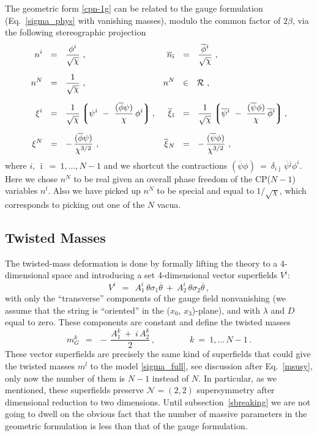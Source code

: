 \documentclass[12pt]{article}
\newcommand{\ntwot}{${\mathcal N}= \left(2,2\right) $ }
\newcommand{\ov}{\overline}
\newcommand{\mc}[1]{\mathcal{#1}}
\newcommand{\lgr}{\left\lgroup}
\newcommand{\rgr}{\right\rgroup}
\newcommand{\bi}{{\bar \imath}}
\newcommand{\bj}{{\bar \jmath}}
\begin{document}
	The geometric form \eqref{cpn-1g} can be related to the gauge formulation (Eq.~\eqref{sigma_phys} with
	vanishing masses), modulo the common factor of $ 2\beta $, via the following stereographic projection
\begin{align}
%
\notag
	n^i & ~~=~~ \frac{\phi^i}{\sqrt{\chi}}~,
	& 
	\ov{n}_\bi & ~~=~~ \frac{\ov{\phi}{}^\bi}{\sqrt{\chi}}~,
\\[2mm]
%
\label{stereo}
	n^N & ~~=~~ \frac{1}{\sqrt{\chi}}~,
	& n^N & ~~\in~~ \mc{R}~,
\\[2mm]
%
\notag
	\xi^i & ~~=~~ \frac{1}{\sqrt{\chi}} \lgr \psi^i ~-~ \frac{(\ov{\phi}\psi)}{\chi}\,\phi^i \rgr,
	& 
	\ov{\xi}{}_\bi & ~~=~~ \frac{1}{\sqrt{\chi}} 
					\lgr \ov{\psi}{}^\bi ~-~ \frac{(\ov{\psi}\phi)}{\chi}\, \ov{\phi}{}^\bi \rgr,
\\[2mm]
%
\notag
	\xi^N & ~~=~~ -\, \frac{(\ov{\phi} \psi)}{\chi^{3/2}}~,
	&
	\ov{\xi}{}_N & ~~=~~ -\, \frac{(\ov{\psi} \phi)}{\chi^{3/2}}~,
\end{align}
	where $	i,\, \bi ~=~ 1, ..., N-1 $ and we shortcut the contractions 
	$ (\ov{\psi} \phi) ~=~ \delta_{i\bj}\, \ov{\psi}{}^\bj \phi^i $.
	Here we chose $ n^N $ to be real given an overall phase freedom of the CP($N-1$) variables $ n^l $.
	Also we have picked up $ n^N $ to be special and equal to $ 1/\sqrt{\chi} $, 
	which corresponds to picking out one of the $ N $ vacua.


\subsection{Twisted Masses}
	The twisted-mass deformation is done by formally lifting the theory to a 4-di\-men\-si\-on\-al space and introducing a set 
	4-dimensional vector superfields $ V^i $:
\begin{equation}
%
\label{Vi}
	V^i ~~=~~ A_1^i\, \theta\sigma_1\ov{\theta} ~+~ A_2^i\, \theta\sigma_2\ov{\theta}\,,
\end{equation}
	with only the ``transverse'' components of the gauge field nonvanishing 
	(we assume that the string is ``oriented'' in the ($x_0$, $x_3$)-plane), and with $ \lambda $ and $ D $ equal to zero.
	These components are constant and define the twisted masses
\begin{equation}
\label{mGi}
	m_G^k ~~=~~ -\, \frac{A_1^k ~+~ i\, A_2^k}{2}\,,
	\qquad\qquad k ~=~ 1, ...\, N-1\,.
\end{equation}
	These vector superfields are precisely the same kind of superfields that could give the twisted masses $m^l$
	to the model \eqref{sigma_full},
	see discussion after Eq.~\eqref{msusy}, only now the number of them is $ N - 1 $ instead of $ N $.
	In particular, as we mentioned, these superfields preserve \ntwot supersymmetry
	after dimensional reduction to two dimensions.
	Until subsection~\ref{sbreaking} we are not going to dwell on the obvious fact that the number of 
	massive parameters in the geometric formulation is less than that of the gauge formulation.
	
\end{document}
